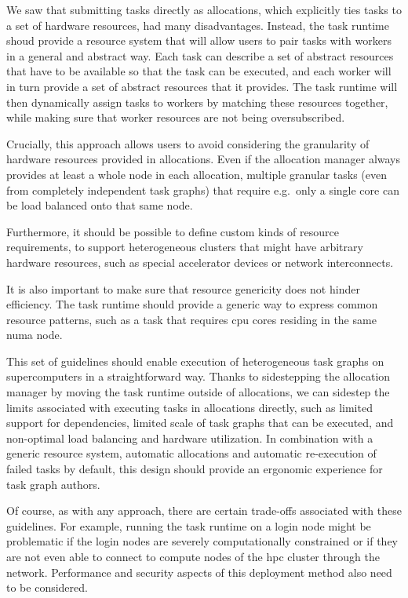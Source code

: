 \begin{description}[wide=0pt]
		We saw that submitting tasks directly as allocations, which explicitly ties tasks to a set of
		hardware resources, had many disadvantages. Instead, the task runtime shoud provide a resource
		system that will allow users to pair tasks with workers in a general and abstract way. Each task
		can describe a set of abstract resources that have to be available so that the task can be
		executed, and each worker will in turn provide a set of abstract resources that it provides. The
		task runtime will then dynamically assign tasks to workers by matching these resources together,
		while making sure that worker resources are not being oversubscribed.

		Crucially, this approach allows users to avoid considering the granularity of hardware resources
		provided in allocations. Even if the allocation manager always provides at least a whole node in
		each allocation, multiple granular tasks (even from completely independent task graphs) that
		require e.g.\ only a single core can be load balanced onto that same node.

		Furthermore, it should be possible to define custom kinds of resource requirements, to support
		heterogeneous clusters that might have arbitrary hardware resources, such as special accelerator
		devices or network interconnects.

		It is also important to make sure that resource genericity does not hinder efficiency. The task
		runtime should provide a generic way to express common resource patterns, such as a task that
		requires \gls{cpu} cores residing in the same \gls{numa} node.
\end{description}

This set of guidelines should enable execution of heterogeneous task graphs on supercomputers in a
straightforward way. Thanks to sidestepping the allocation manager by moving the task runtime
outside of allocations, we can sidestep the limits associated with executing tasks in allocations
directly, such as limited support for dependencies, limited scale of task graphs that can be
executed, and non-optimal load balancing and hardware utilization. In combination with a generic
resource system, automatic allocations and automatic re-execution of failed tasks by default, this
design should provide an ergonomic experience for task graph authors.

Of course, as with any approach, there are certain trade-offs associated with these guidelines. For
example, running the task runtime on a login node might be problematic if the login nodes are
severely computationally constrained or if they are not even able to connect to compute nodes of
the \gls{hpc} cluster through the network. Performance and security aspects of this
deployment method also need to be considered.

